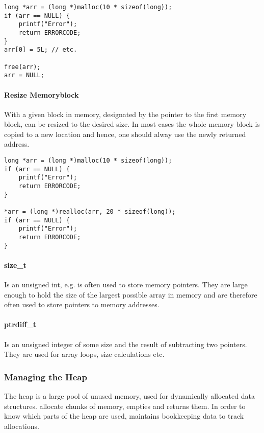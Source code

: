 \begin{lstlisting}
long *arr = (long *)malloc(10 * sizeof(long));
if (arr == NULL) {
    printf("Error");
    return ERRORCODE;
}
arr[0] = 5L; // etc.

free(arr);
arr = NULL;
\end{lstlisting}

\paragraph{Resize Memoryblock}
With  a given block in memory, designated by the pointer to the first memory block, can be resized to the desired size. In most cases the whole memory block is copied to a new location and hence, one should alway use the newly returned address.

\begin{lstlisting}
long *arr = (long *)malloc(10 * sizeof(long));
if (arr == NULL) {
    printf("Error");
    return ERRORCODE;
}

*arr = (long *)realloc(arr, 20 * sizeof(long));
if (arr == NULL) {
    printf("Error");
    return ERRORCODE;
}
\end{lstlisting}

\paragraph{size\_t}
Is an unsigned int, e.g.  is often used to store memory pointers. They are large enough to hold the size of the largest possible array in memory and are therefore often used to store pointers to memory addresses.

\paragraph{ptrdiff\_t}
Is an unsigned integer of some size and the result of subtracting two pointers. They are used for array loops, size calculations etc.

\subsubsection{Managing the Heap}
The heap is a large pool of unused memory, used for dynamically allocated data structures.  allocate chunks of memory,  empties and returns them. In order to know which parts of the heap are used,  maintains bookkeeping data to track allocations.

